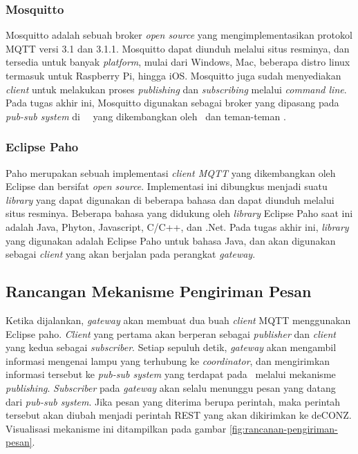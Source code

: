 \subsubsection{Mosquitto}
Mosquitto adalah sebuah broker \textit{open source} yang mengimplementasikan protokol MQTT versi 3.1 dan 3.1.1. Mosquitto dapat diunduh melalui situs resminya, dan tersedia untuk banyak \textit{platform}, mulai dari Windows, Mac, beberapa distro linux termasuk untuk Raspberry Pi, hingga iOS. Mosquitto juga sudah menyediakan \textit{client} untuk melakukan proses \textit{publishing} dan \textit{subscribing} melalui \textit{command line}. Pada tugas akhir ini, Mosquitto digunakan sebagai broker yang dipasang pada \textit{pub-sub system} di \plat~\iot~yang dikembangkan oleh \saya~dan teman-teman \saya.

\subsubsection{Eclipse Paho}
Paho merupakan sebuah implementasi \textit{client MQTT} yang dikembangkan oleh Eclipse dan bersifat \textit{open source}. Implementasi ini dibungkus menjadi suatu \textit{library} yang dapat digunakan di beberapa bahasa dan dapat diunduh melalui situs resminya. Beberapa bahasa yang didukung oleh \textit{library} Eclipse Paho saat ini adalah Java, Phyton, Javascript, C/C++, dan .Net. Pada tugas akhir ini, \textit{library} yang digunakan adalah Eclipse Paho untuk bahasa Java, dan akan digunakan sebagai \textit{client} yang akan berjalan pada perangkat \textit{gateway}.

\subsection{Rancangan Mekanisme Pengiriman Pesan}
Ketika dijalankan, \textit{gateway} akan membuat dua buah \textit{client} MQTT menggunakan Eclipse paho. \textit{Client} yang pertama akan berperan sebagai \textit{publisher} dan \textit{client} yang kedua sebagai \textit{subscriber}. Setiap sepuluh detik, \textit{gateway} akan mengambil informasi mengenai lampu yang terhubung ke \textit{coordinator}, dan mengirimkan informasi tersebut ke \textit{pub-sub system} yang terdapat pada \plat~melalui mekanisme \textit{publishing}. \textit{Subscriber} pada \textit{gateway} akan selalu menunggu pesan yang datang dari \textit{pub-sub system}. Jika pesan yang diterima berupa perintah, maka perintah tersebut akan diubah menjadi perintah REST yang akan dikirimkan ke deCONZ. Visualisasi mekanisme ini ditampilkan pada gambar \ref{fig:rancanan-pengiriman-pesan}.

